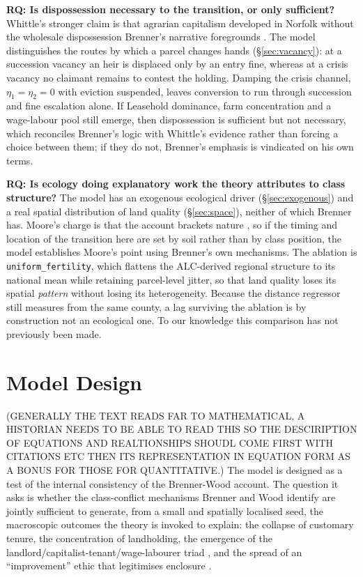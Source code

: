 \documentclass[11pt,english]{article}
\newcounter{rqctr}
\renewcommand{\therqctr}{\arabic{rqctr}}
\newcommand{\rqitem}[2]{%
  \refstepcounter{rqctr}\label{#1}%
  \medskip\noindent\textbf{RQ\therqctr: #2}}
\begin{document}
\rqitem{rq:dispossession}{Is dispossession necessary to the transition, or only sufficient?}
Whittle's stronger claim is that agrarian capitalism developed in Norfolk without the wholesale dispossession Brenner's narrative foregrounds \cite{whittle2000development}. The model distinguishes the routes by which a parcel changes hands (\S\ref{sec:vacancy}): at a succession vacancy an heir is displaced only by an entry fine, whereas at a crisis vacancy no claimant remains to contest the holding. Damping the crisis channel, $\eta_1=\eta_2=0$ with eviction suspended, leaves conversion to run through succession and fine escalation alone. If Leasehold dominance, farm concentration and a wage-labour pool still emerge, then dispossession is sufficient but not necessary, which reconciles Brenner's logic with Whittle's evidence rather than forcing a choice between them; if they do not, Brenner's emphasis is vindicated on his own terms.

\rqitem{rq:ecology}{Is ecology doing explanatory work the theory attributes to class structure?}
The model has an exogenous ecological driver (\S\ref{sec:exogenous}) and a real spatial distribution of land quality (\S\ref{sec:space}), neither of which Brenner has. Moore's charge is that the account brackets nature \cite{moore2003nature,moore2015capitalism}, so if the timing and location of the transition here are set by soil rather than by class position, the model establishes Moore's point using Brenner's own mechanisms. The ablation is \texttt{uniform\_fertility}, which flattens the ALC-derived regional structure to its national mean while retaining parcel-level jitter, so that land quality loses its spatial \emph{pattern} without losing its heterogeneity. Because the distance regressor still measures from the same county, a lag surviving the ablation is by construction not an ecological one. To our knowledge this comparison has not previously been made.


\section{Model Design}
\label{sec:model}
(GENERALLY THE TEXT READS FAR TO MATHEMATICAL, A HISTORIAN NEEDS TO BE ABLE TO READ THIS SO THE DESCIRIPTION OF EQUATIONS AND REALTIONSHIPS SHOUDL COME FIRST WITH CITATIONS ETC THEN ITS REPRESENTATION IN EQUATION FORM AS A BONUS FOR THOSE FOR QUANTITATIVE.)
The model is designed as a test of the internal consistency of the Brenner-Wood account. The question it asks is whether the class-conflict mechanisms Brenner and Wood identify are jointly sufficient to generate, from a small and spatially localised seed, the macroscopic outcomes the theory is invoked to explain: the collapse of customary tenure, the concentration of landholding, the emergence of the landlord/capitalist-tenant/wage-labourer triad \cite[p.63]{brenner1976agrarian}, and the spread of an ``improvement'' ethic that legitimises enclosure \cite[p.108-109]{wood2002origin}. 
\end{document}
